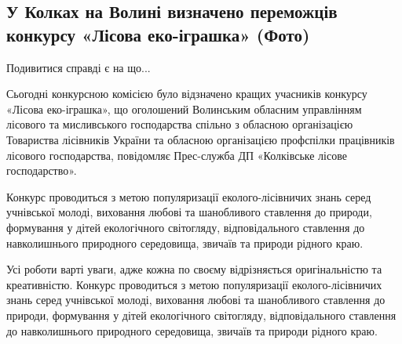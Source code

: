  
 
 
 
 
\subsection{У Колках на Волині визначено переможців конкурсу «Лісова еко-іграшка» (Фото)}
\label{sec:28_12_2021.stz.news.ua.volyn.1.lisova_egoigrashka_konkurs}


Подивитися справді є на що...

Сьогодні конкурсною комісією було відзначено кращих учасників конкурсу «Лісова
еко-іграшка», що оголошений Волинським обласним управлінням лісового та
мисливського господарства спільно з обласною організацією Товариства лісівників
України та обласною організацією профспілки працівників лісового господарства,
повідомляє Прес-служба ДП «Колківське лісове господарство».


\begin{zznagolos}
Конкурс проводиться з метою популяризації еколого-лісівничих знань серед
учнівської молоді, виховання любові та шанобливого ставлення до природи,
формування у дітей екологічного світогляду, відповідального ставлення до
навколишнього природного середовища, звичаїв та природи рідного краю.	
\end{zznagolos}

Усі роботи варті уваги, адже кожна по своєму відрізняється оригінальністю та
креативністю. Конкурс проводиться з метою популяризації еколого-лісівничих
знань серед учнівської молоді, виховання любові та шанобливого ставлення до
природи, формування у дітей екологічного світогляду, відповідального ставлення
до навколишнього природного середовища, звичаїв та природи рідного краю.

